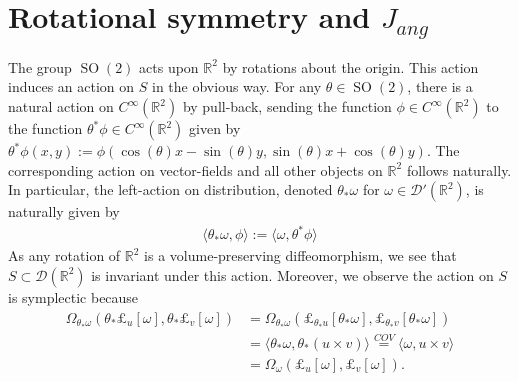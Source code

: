 \documentclass[12pt]{amsart}
\DeclareMathOperator{\SO}{SO}
\begin{document}
\section{Rotational symmetry and $J_{ang}$}
The group $\SO(2)$ acts upon $\mathbb{R}^2$ by rotations about the origin.
This action induces an action on $S$ in the obvious way.  For any $\theta \in \SO(2)$, there is a natural action on $C^{\infty}(\mathbb{R}^2)$ by pull-back, sending the function $\phi \in C^{\infty}(\mathbb{R}^2)$ to the function $\theta^*\phi \in C^{\infty}(\mathbb{R}^2)$ given by $\theta^*\phi(x,y) := \phi(\cos(\theta)x-\sin(\theta)y,\sin(\theta)x+\cos(\theta)y)$.  The corresponding action on vector-fields and all other objects on $\mathbb{R}^2$ follows naturally.  
 In particular, the left-action on distribution, denoted $\theta_* \omega$ for $\omega \in \mathcal{D}'(\mathbb{R}^2)$, is naturally given by
\begin{align*}
  \langle \theta_* \omega , \phi \rangle := \langle \omega , \theta^* \phi \rangle
\end{align*}
As any rotation of $\mathbb{R}^2$ is a volume-preserving diffeomorphism, we see that $S \subset \mathcal{D}(\mathbb{R}^2)$ is invariant under this action.  Moreover, we observe the action on $S$ is symplectic because
\begin{align*}
  \Omega_{\theta_* \omega}( \theta_*\pounds_{u}[ \omega] , \theta_*\pounds_v[\omega] ) &= \Omega_{\theta_* \omega} ( \pounds_{\theta_*u}[ \theta_*\omega] ,
  \pounds_{\theta_*v}[\theta_*\omega] ) \\
  &= \langle \theta_* \omega , \theta_*(u \times v) \rangle \stackrel{COV}{=} \langle \omega, u \times v \rangle \\
  &= \Omega_{\omega}( \pounds_u[\omega], \pounds_v[\omega]).
\end{align*}
\end{document}
